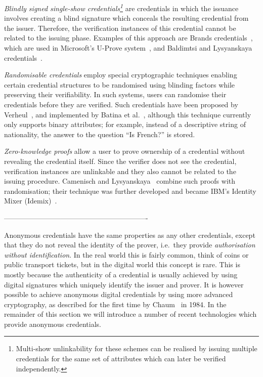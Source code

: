 \label{unlinkApproaches}
\emph{Blindly signed single-show credentials\footnote{Multi-show unlinkability
for these schemes can be realised by issuing multiple credentials for the same
set of attributes which can later be verified independently.}} are credentials
in which the issuance involves creating a blind signature which conceals the
resulting credential from the issuer. Therefore, the verification instances of
this credential cannot be related to the issuing phase. Examples of this
approach are Brands credentials~\cite{Brands2000}, which are used in
Microsoft's U-Prove system~\cite{U-Prove_Crypto2011}, and Baldimtsi and
Lysyanskaya credentials~\cite{BaLy2012}.

\emph{Randomisable credentials} employ special cryptographic techniques
enabling certain credential structures to be randomised using blinding factors
while preserving their verifiability. In such systems, users can randomise their
credentials before they are verified. Such credentials have been proposed by
Verheul~\cite{Verheul01}, and implemented by Batina et
al.~\cite{BatinaHJMV10}, although this technique currently only supports binary
attributes; for example, instead of a descriptive string of nationality, the
answer to the question ``Is French?'' is stored.

\emph{Zero-knowledge proofs} allow a user to prove ownership of a credential
without revealing the credential itself. Since the verifier does not see the
credential, verification instances are unlinkable and they also cannot be
related to the issuing procedure. Camenisch and
Lysyanskaya~\cite{CamenischLysyanskaya2001,CamenischLysyanskaya2003} combine such proofs with randomisation; their
technique was further developed and became IBM's Identity Mixer
(Idemix)~\cite{IdemixCrypto2012}.


-------------------------------------------------------------



Anonymous credentials have the same properties as any other credentials,
except that they do not reveal the identity of the prover, i.e.\ they provide
\emph{authorisation without identification}. In the real world this is
fairly common, think of coins or public transport tickets, but in the
digital world this concept is rare. This is mostly because the
authenticity of a credential is usually achieved by using digital
signatures which uniquely identify the issuer and prover. It is however
possible to achieve anonymous digital credentials by using more advanced
cryptography, as described for the first time by Chaum~\cite{Chaum1985} in
1984. In the remainder of this section we will introduce a number of recent
technologies which provide anonymous credentials.

